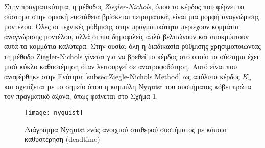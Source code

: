 Στην πραγματικότητα, η μέθοδος \emph{Ziegler-Nichols}, όπου το κέρδος που φέρνει το σύστημα στην οριακή ευστάθεια βρίσκεται πειραματικά, είναι μια μορφή αναγνώρισης μοντέλου. Όλες οι τεχνικές ρύθμισης στην πραγματικότητα περιέχουν κομμάτια αναγνώρισης μοντέλου,
αλλά οι πιο δημοφιλείς απλά βελτιώνουν και αποκρύπτουν αυτά τα κομμάτια καλύτερα. Στην ουσία, όλη η διαδικασία ρύθμισης χρησιμοποιώντας τη μέθοδο Ziegler-Nichols γίνεται για να βρεθεί το κέρδος στο οποίο το σύστημα έχει μισό κύκλο καθυστέρηση όταν λειτουργεί σε ανατροφοδότηση. Αυτό είναι που αναφέρθηκε στην Ενότητα \ref{subsec:Ziegle-Nichols Method} ως απόλυτο κέρδος $K_u$ και σχετίζεται με το σημείο όπου η καμπύλη Nyquist του συστήματος κόβει πρώτα τον πραγματικό άξονα, όπως φαίνεται στο Σχήμα \ref{fig:nyquist}.

\begin{figure}[h]
  \centering
  \texttt{[image: nyquist]}
  \caption{Διάγραμμα Nyquist ενός ανοιχτού σταθερού συστήματος με κάποια καθυστέρηση (deadtime)}
  \label{fig:nyquist}
\end{figure}

